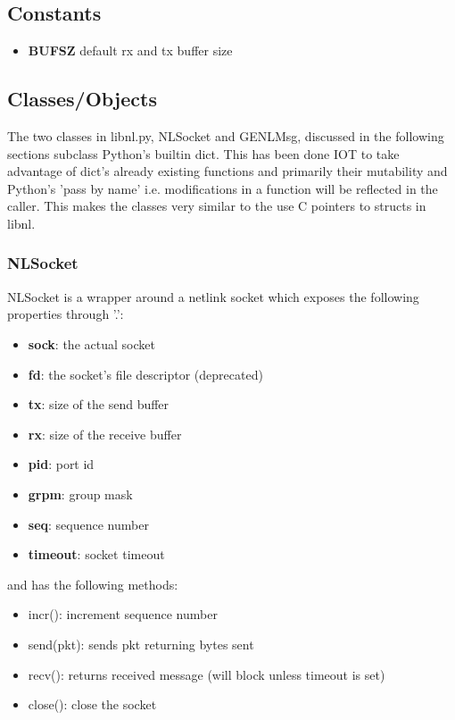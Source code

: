 \documentclass[11pt]{article}
\begin{document}
\begin{appendices}
\subsection{Constants}
\begin{itemize}
\item \textbf{BUFSZ} default rx and tx buffer size
\end{itemize}

\subsection{Classes/Objects}
The two classes in libnl.py, NLSocket and GENLMsg, discussed in the following 
sections subclass Python's builtin dict. This has been done IOT to take advantage 
of dict's already existing functions and primarily their mutability and Python's
'pass by name' i.e. modifications in a function will be reflected in the caller.
This makes the classes very similar to the use C pointers to structs in libnl.

\subsubsection{NLSocket}
NLSocket is a wrapper around a netlink socket which exposes the following 
properties through '.':
\begin{itemize}
\item \textbf{sock}: the actual socket
\item \textbf{fd}: the socket's file descriptor (deprecated)
\item \textbf{tx}: size of the send buffer
\item \textbf{rx}: size of the receive buffer
\item \textbf{pid}: port id
\item \textbf{grpm}: group mask 
\item \textbf{seq}: sequence number
\item \textbf{timeout}: socket timeout
\end{itemize}
and has the following methods:
\begin{itemize}
\item incr(): increment sequence number
\item send(pkt): sends pkt returning bytes sent
\item recv(): returns received message (will block unless timeout is set)
\item close(): close the socket
\end{itemize}


\end{appendices}
\end{document}
